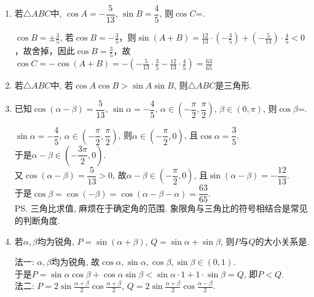\begin{enumerate}

\item 若$\triangle{ABC}$中, $\cos{A}=-\dfrac{5}{13}$, $\sin{B}=\dfrac{4}{5}$, 则$\cos{C}$=. 
\begin{jieda}
$\cos{B}=\pm\frac{3}{5}$, 若$\cos{B} = -\frac{3}{5}$，则$\sin{\left(A+B\right)} = \frac{12}{13} \cdot \left(-\frac{3}{5}\right) + \left(-\frac{5}{13}\right) \cdot \frac{4}{5} < 0$，故舍掉，因此$\cos{B}=\frac{3}{5}$，故$\cos{C} = -\cos{\left(A+B\right)} = -\left(-\frac{5}{13} \cdot \frac{3}{5} - \frac{12}{13} \cdot \frac{4}{5}\right) = \frac{63}{65}$
\end{jieda}
\item 若$\triangle{ABC}$中, 若$\cos{A}\cos{B}>\sin{A}\sin{B}$, 则$\triangle{ABC}$是三角形. 

\item 已知$\cos\left(\alpha-\beta\right)=\dfrac{5}{13}$, $\sin\alpha=-\dfrac{4}{5}$, $\alpha\in\left(-\dfrac{\pi}{2},\dfrac{\pi}{2}\right)$, 
$\beta\in\left(0,\pi\right)$, 则$\cos\beta$=. 
\begin{jieda}
$\sin\alpha=-\dfrac{4}{5}$, $\alpha\in\left(-\dfrac{\pi}{2},\dfrac{\pi}{2}\right)$, 则$\alpha\in\left(-\dfrac{\pi}{2},0\right)$, 且$\cos\alpha=\dfrac{3}{5}$. \\
于是$\alpha-\beta\in\left(-\dfrac{3\pi}{2},0\right)$. \\
又$\cos\left(\alpha-\beta\right)=\dfrac{5}{13}>0$, 故$\alpha-\beta\in\left(-\dfrac{\pi}{2},0\right)$, 且$\sin\left(\alpha-\beta\right)=-\dfrac{12}{13}$. \\
于是$\cos\beta=\cos\left(-\beta\right)=\cos\left(\alpha-\beta-\alpha\right)=\dfrac{63}{65}$. \\
\ps 三角比求值, 麻烦在于确定角的范围. 象限角与三角比的符号相结合是常见的判断角度. 
\end{jieda}
\item 若$\alpha,\beta$均为锐角, $P=\sin\left(\alpha+\beta\right)$, $Q=\sin\alpha+\sin\beta$, 则$P$与$Q$的大小关系是. 
\begin{jieda}
法一: $\alpha,\beta$均为锐角, 故$\cos\alpha,\sin\alpha,\cos\beta,\sin\beta\in\left(0,1\right)$. \\
于是$P=\sin\alpha\cos\beta+\cos\alpha\sin\beta<\sin\alpha\cdot 1+1\cdot\sin\beta=Q$, 即$P<Q$. \\
法二: $P=2\sin\frac{\alpha+\beta}{2}\cos\frac{\alpha+\beta}{2}$, $Q=2\sin\frac{\alpha+\beta}{2}\cos\frac{\alpha-\beta}{2}$. 
\end{jieda}


\end{enumerate}
